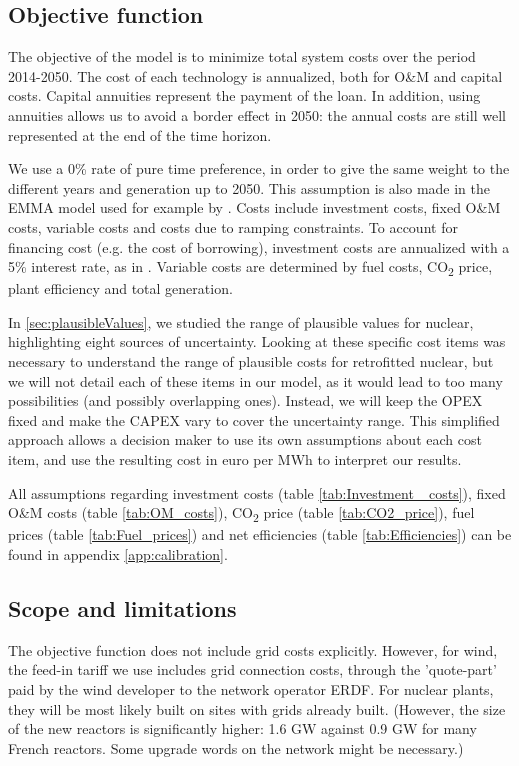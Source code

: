 \subsection{Objective function}

The objective of the model is to minimize total system costs over the period 2014-2050.
The cost of each technology is annualized, both for O\&M and capital costs. 
Capital annuities represent the payment of the loan. 
In addition, using annuities allows us to avoid a border effect in 2050: the annual costs are still well represented at the end of the time horizon.

We use a 0\% rate of pure time preference, in order to give the same weight to the different years and generation up to 2050. This assumption is also made in the EMMA model \citep{EMMA} used for example by \citet{Hirth2016}.
Costs include investment costs, fixed O\&M costs, variable costs and costs due to ramping constraints.
To account for financing cost (e.g. the cost of borrowing), investment costs are annualized with a 5\% interest rate, as in \citet{Jagemann2013}.
Variable costs are determined by fuel costs, CO\textsubscript{2} price, plant efficiency and total generation.

In \ref{sec:plausibleValues}, we studied the range of plausible values for nuclear, highlighting eight sources of uncertainty. Looking at these specific cost items was necessary to understand the range of plausible costs for retrofitted nuclear, but we will not detail each of these items in our model, as it would lead to too many possibilities (and possibly overlapping ones). Instead, we will keep the OPEX fixed and make the CAPEX vary to cover the uncertainty range. This simplified approach allows a decision maker to use its own assumptions about each cost item, and use the resulting cost in euro per MWh to interpret our results.

All assumptions regarding investment costs (table \ref{tab:Investment _costs}), fixed O\&M costs (table \ref{tab:OM_costs}), CO\textsubscript{2} price (table \ref{tab:CO2_price}), fuel prices (table \ref{tab:Fuel_prices}) and net efficiencies (table \ref{tab:Efficiencies}) can be found in appendix \ref{app:calibration}.

\subsection{Scope and limitations}

The objective function does not include grid costs explicitly.
However, for wind, the feed-in tariff we use includes grid connection costs, through the 'quote-part' paid by the wind developer to the network operator ERDF.
For nuclear plants, they will be most likely built on sites with grids already built. (However, the size of the new reactors is significantly higher: 1.6 GW against 0.9 GW for many French reactors. Some upgrade words on the network might be necessary.)

